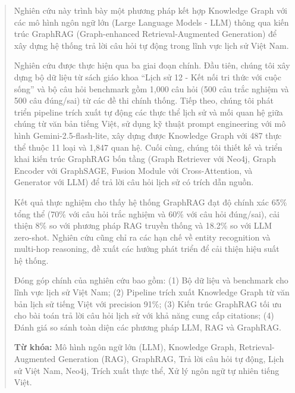 \begin{abstract}
Nghiên cứu này trình bày một phương pháp kết hợp Knowledge Graph với các mô hình ngôn ngữ lớn (Large Language Models - LLM) thông qua kiến trúc GraphRAG (Graph-enhanced Retrieval-Augmented Generation) để xây dựng hệ thống trả lời câu hỏi tự động trong lĩnh vực lịch sử Việt Nam.

Nghiên cứu được thực hiện qua ba giai đoạn chính. Đầu tiên, chúng tôi xây dựng bộ dữ liệu từ sách giáo khoa ``Lịch sử 12 - Kết nối tri thức với cuộc sống'' và bộ câu hỏi benchmark gồm 1,000 câu hỏi (500 câu trắc nghiệm và 500 câu đúng/sai) từ các đề thi chính thống. Tiếp theo, chúng tôi phát triển pipeline trích xuất tự động các thực thể lịch sử và mối quan hệ giữa chúng từ văn bản tiếng Việt, sử dụng kỹ thuật prompt engineering với mô hình Gemini-2.5-flash-lite, xây dựng được Knowledge Graph với 487 thực thể thuộc 11 loại và 1,847 quan hệ. Cuối cùng, chúng tôi thiết kế và triển khai kiến trúc GraphRAG bốn tầng (Graph Retriever với Neo4j, Graph Encoder với GraphSAGE, Fusion Module với Cross-Attention, và Generator với LLM) để trả lời câu hỏi lịch sử có trích dẫn nguồn.

Kết quả thực nghiệm cho thấy hệ thống GraphRAG đạt độ chính xác 65\% tổng thể (70\% với câu hỏi trắc nghiệm và 60\% với câu hỏi đúng/sai), cải thiện 8\% so với phương pháp RAG truyền thống và 18.2\% so với LLM zero-shot. Nghiên cứu cũng chỉ ra các hạn chế về entity recognition và multi-hop reasoning, đề xuất các hướng phát triển để cải thiện hiệu suất hệ thống.

Đóng góp chính của nghiên cứu bao gồm: (1) Bộ dữ liệu và benchmark cho lĩnh vực lịch sử Việt Nam; (2) Pipeline trích xuất Knowledge Graph từ văn bản lịch sử tiếng Việt với precision 91\%; (3) Kiến trúc GraphRAG tối ưu cho bài toán trả lời câu hỏi lịch sử với khả năng cung cấp citations; (4) Đánh giá so sánh toàn diện các phương pháp LLM, RAG và GraphRAG.

\textbf{Từ khóa:} Mô hình ngôn ngữ lớn (LLM), Knowledge Graph, Retrieval-Augmented Generation (RAG), GraphRAG, Trả lời câu hỏi tự động, Lịch sử Việt Nam, Neo4j, Trích xuất thực thể, Xử lý ngôn ngữ tự nhiên tiếng Việt.
\end{abstract}
